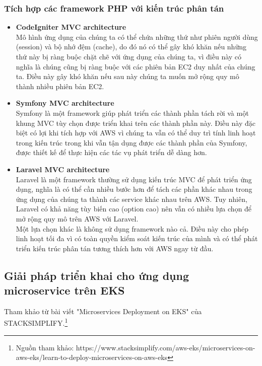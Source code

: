 \subsubsection{Tích hợp các framework PHP với kiến trúc phân tán}
    \begin{itemize}
        \item \textbf{CodeIgniter MVC architecture}
        \\[0.2cm]
        Mô hình ứng dụng của chúng ta có thể chứa những thứ như phiên người dùng (session) và bộ nhớ đệm (cache), do đó nó có thể gây khó khăn nếu những thứ này bị ràng buộc chặt chẽ với ứng dụng của chúng ta, vì điều này có nghĩa là chúng cũng bị ràng buộc với các phiên bản EC2 duy nhất của chúng ta. Điều này gây khó khăn nếu sau này chúng ta muốn mở rộng quy mô thành nhiều phiên bản EC2.
        \item \textbf{Symfony MVC architecture}
        \\[0.2cm]
        Symfony là một framework giúp phát triển các thành phần tách rời và một khung MVC tùy chọn được triển khai trên các thành phần này. Điều này đặc biệt có lợi khi tích hợp với AWS vì chúng ta vẫn có thể duy trì tính linh hoạt trong kiến trúc trong khi vẫn tận dụng được các thành phần của Symfony, được thiết kế để thực hiện các tác vụ phát triển dễ dàng hơn.
        \item \textbf{Laravel MVC architecture}
        \\[0.2cm]
        Laravel là một framework thường sử dụng kiến trúc MVC để phát triển ứng dụng, nghĩa là có thể cần nhiều bước hơn để tách các phần khác nhau trong ứng dụng của chúng ta thành các service khác nhau trên AWS. Tuy nhiên, Laravel có khả năng tùy biến cao (option cao) nên vẫn có nhiều lựa chọn để mở rộng quy mô trên AWS với Laravel.\\[0.5cm]
        Một lựa chọn khác là không sử dụng framework nào cả. Điều này cho phép linh hoạt tối đa vì có toàn quyền kiểm soát kiến trúc của mình và có thể phát triển kiến trúc phân tán tương thích hơn với AWS ngay từ đầu.
    \end{itemize}
\newpage
\subsection{Giải pháp triển khai cho ứng dụng microservice trên EKS}
\noindent Tham khảo từ bài viết "Microservices Deployment on EKS" của STACKSIMPLIFY.\footnote{Nguồn tham khảo: https://www.stacksimplify.com/aws-eks/microservices-on-aws-eks/learn-to-deploy-microservices-on-aws-eks}
